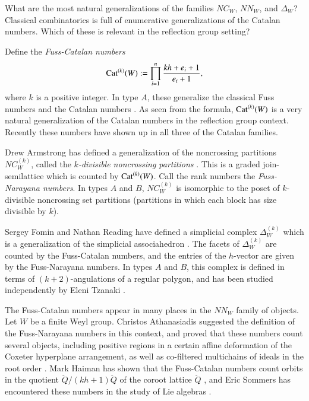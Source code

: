 \documentclass[12pt,letterpaper, reqno]{aimpl}
\newcommand{\Cat}{{\rm Cat}}
\begin{document}
\begin{problemblock}

\begin{problem}[1.4]
\label{central:three}
What are the most natural generalizations of the families $NC_W$, $NN_W$, and $\Delta_W$? Classical combinatorics is full of enumerative generalizations of the Catalan numbers. Which of these is relevant in the reflection group setting?
\end{problem}

Define the \emph{Fuss-Catalan numbers}
\begin{equation*}
\Cat^{(k)}(W):= \prod_{i=1}^n \frac{kh+e_i+1}{e_i+1},
\end{equation*}
where $k$ is a positive integer. In type $A$, these generalize the classical Fuss numbers and the Catalan numbers \cite{fomin-reading,hilton-pederson}. As seen from the formula, $\Cat^{(k)}(W)$ is a very natural generalization of the Catalan numbers in the reflection group context. Recently these numbers  have shown up in all three of the Catalan families.

\begin{remark}
Drew Armstrong has defined a generalization of the noncrossing partitions $NC_W^{(k)}$, called the \emph{$k$-divisible noncrossing partitions} \cite{armstrong}. This is a graded join-semilattice which is counted by $\Cat^{(k)}(W)$. Call the rank numbers the \emph{Fuss-Narayana numbers}. In types $A$ and $B$, $NC_W^{(k)}$ is isomorphic to the poset of $k$-divisible noncrossing set partitions (partitions in which each block has size divisible by $k$).
\end{remark}

\begin{remark}
Sergey Fomin and Nathan Reading have defined a simplicial complex $\Delta^{(k)}_W$ which is a generalization of the simplicial associahedron \cite{fomin-reading}. The facets of $\Delta^{(k)}_W$ are counted by the Fuss-Catalan numbers, and the entries of the $h$-vector are given by the Fuss-Narayana numbers. In types $A$ and $B$, this complex is defined in terms of $(k+2)$-angulations of a regular polygon, and has been studied independently by Eleni Tzanaki \cite{tzanaki}.
\end{remark}

\begin{remark}
The Fuss-Catalan numbers appear in many places in the $NN_W$ family of objects. Let $W$ be a finite Weyl group. Christos Athanasiadis suggested the definition of the Fuss-Narayana numbers in this context, and proved that these numbers count several objects, including positive regions in a certain affine deformation of the Coxeter hyperplane arrangement, as well as co-filtered multichains of ideals in the root order \cite{athanasiadis:cat,athanasiadis:nar}. Mark Haiman has shown that the Fuss-Catalan numbers count orbits in the quotient $\check{Q}/(kh+1)\check{Q}$ of the coroot lattice $\check{Q}$ \cite{haiman:conjectures}, and Eric Sommers has encountered these numbers in the study of Lie algebras \cite{sommers}.
\end{remark}
\end{problemblock}
\end{document}
